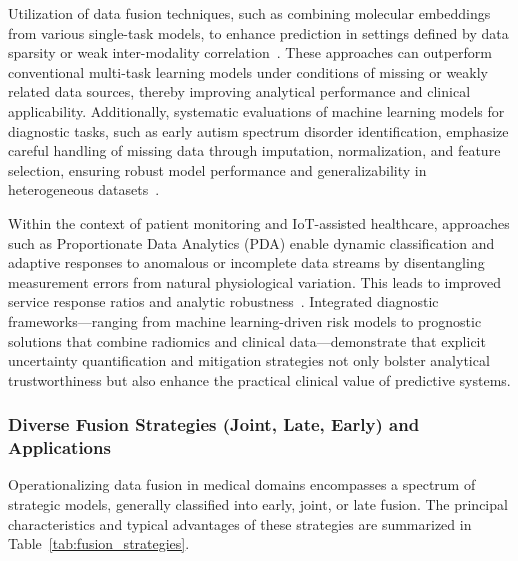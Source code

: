 \documentclass[sigconf]{acmart}
\begin{document}
Utilization of data fusion techniques, such as combining molecular embeddings from various single-task models, to enhance prediction in settings defined by data sparsity or weak inter-modality correlation~\cite{ref76}. These approaches can outperform conventional multi-task learning models under conditions of missing or weakly related data sources, thereby improving analytical performance and clinical applicability. Additionally, systematic evaluations of machine learning models for diagnostic tasks, such as early autism spectrum disorder identification, emphasize careful handling of missing data through imputation, normalization, and feature selection, ensuring robust model performance and generalizability in heterogeneous datasets~\cite{ref89}.

Within the context of patient monitoring and IoT-assisted healthcare, approaches such as Proportionate Data Analytics (PDA) enable dynamic classification and adaptive responses to anomalous or incomplete data streams by disentangling measurement errors from natural physiological variation. This leads to improved service response ratios and analytic robustness~\cite{ref90}. Integrated diagnostic frameworks—ranging from machine learning-driven risk models to prognostic solutions that combine radiomics and clinical data—demonstrate that explicit uncertainty quantification and mitigation strategies not only bolster analytical trustworthiness but also enhance the practical clinical value of predictive systems.

\subsubsection{Diverse Fusion Strategies (Joint, Late, Early) and Applications}

Operationalizing data fusion in medical domains encompasses a spectrum of strategic models, generally classified into early, joint, or late fusion. The principal characteristics and typical advantages of these strategies are summarized in Table~\ref{tab:fusion_strategies}.
\end{document}
